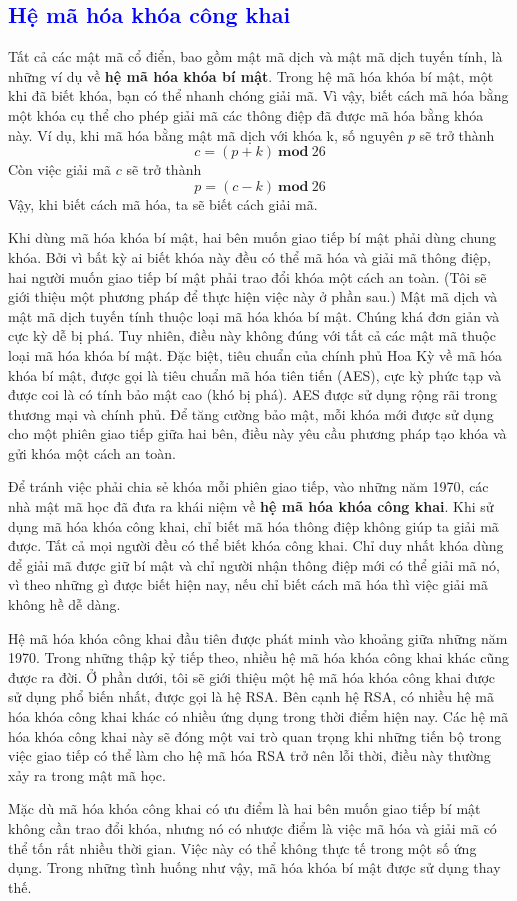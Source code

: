 \textcolor{blue}{\section{Hệ mã hóa khóa công khai}}
Tất cả các mật mã cổ điển, bao gồm mật mã dịch và mật mã dịch tuyến tính, là những ví dụ về \textbf{hệ mã hóa khóa bí mật}. Trong hệ mã hóa khóa bí mật, một khi đã biết khóa, bạn có thể nhanh chóng giải mã. Vì vậy, biết cách mã hóa bằng một khóa cụ thể cho phép giải mã các thông điệp đã được mã hóa bằng khóa này. Ví dụ, khi mã hóa bằng mật mã dịch với khóa k, số nguyên $p$ sẽ trở thành
$$c = (p+k)\ \mathbf{mod}\ 26$$
Còn việc giải mã $c$ sẽ trở thành
$$p = (c-k)\ \mathbf{mod}\ 26$$
Vậy, khi biết cách mã hóa, ta sẽ biết cách giải mã.

Khi dùng mã hóa khóa bí mật, hai bên muốn giao tiếp bí mật phải dùng chung khóa.
Bởi vì bất kỳ ai biết khóa này đều có thể mã hóa và giải mã thông điệp, hai người muốn giao tiếp bí mật phải trao đổi khóa một cách an toàn.
(Tôi sẽ giới thiệu một phương pháp để thực hiện việc này ở phần sau.)
Mật mã dịch và mật mã dịch tuyến tính thuộc loại mã hóa khóa bí mật. Chúng khá đơn giản và cực kỳ dễ bị phá.
Tuy nhiên, điều này không đúng với tất cả các mật mã thuộc loại mã hóa khóa bí mật.
Đặc biệt, tiêu chuẩn của chính phủ Hoa Kỳ về mã hóa khóa bí mật, được gọi là tiêu chuẩn mã hóa tiên tiến (AES), cực kỳ
phức tạp và được coi là có tính bảo mật cao (khó bị phá).
AES được sử dụng rộng rãi trong thương mại và chính phủ.
Để tăng cường bảo mật, mỗi khóa mới được sử dụng cho một phiên giao tiếp giữa hai bên, điều này yêu cầu phương pháp tạo khóa và gửi khóa một cách an toàn.

Để tránh việc phải chia sẻ khóa mỗi phiên giao tiếp, vào những năm 1970, các nhà mật mã học đã đưa ra khái niệm về \textbf{hệ mã hóa khóa công khai}.
Khi sử dụng mã hóa khóa công khai, chỉ biết mã hóa thông điệp không giúp ta giải mã được. Tất cả mọi người đều có thể biết khóa công khai.
Chỉ duy nhất khóa dùng để giải mã được giữ bí mật và chỉ người nhận thông điệp mới có thể giải mã nó,
vì theo những gì được biết hiện nay, nếu chỉ biết cách mã hóa thì việc giải mã không hề dễ dàng.

Hệ mã hóa khóa công khai đầu tiên được phát minh vào khoảng giữa những năm 1970. Trong những thập kỷ tiếp theo,
nhiều hệ mã hóa khóa công khai khác cũng được ra đời. Ở phần dưới, tôi sẽ giới thiệu một hệ mã hóa khóa công khai được sử dụng phổ biến nhất, được gọi là hệ RSA.
Bên cạnh hệ RSA, có nhiều hệ mã hóa khóa công khai khác có nhiều ứng dụng trong thời điểm hiện nay.
Các hệ mã hóa khóa công khai này sẽ đóng một vai trò quan trọng khi những tiến bộ trong việc giao tiếp có thể làm cho hệ mã hóa RSA trở nên lỗi thời, điều này thường xảy ra trong mật mã học.

Mặc dù mã hóa khóa công khai có ưu điểm là hai bên muốn giao tiếp bí mật không cần trao đổi khóa, nhưng nó có nhược điểm là việc mã hóa và giải mã có thể tốn rất nhiều thời gian.
Việc này có thể không thực tế trong một số ứng dụng. Trong những tình huống như vậy, mã hóa khóa bí mật được sử dụng thay thế.